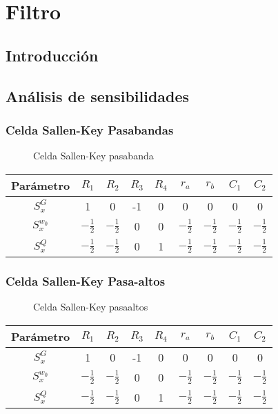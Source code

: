 \documentclass[../tc_tpfinal_main.tex]{subfiles}
\begin{document}
\chapter{Filtro}

\section{Introducción} 

\section{Análisis de sensibilidades}
\subsection{Celda Sallen-Key Pasabandas}

\begin{figure}[H]
	\centering
	
	\caption{Celda Sallen-Key pasabanda}
	\label{fig:sk_lp_schem}
\end{figure}

\begin{table}[H] 
	\centering
 				\begin{tabular}{||c c c c c c c c c||} 
 					\hline
	  Parámetro& $R_1$ & $R_2$ & $R_3$ & $R_4$ & $r_a$ & $r_b$&$C_1$&$C_2$\\ [0.5ex] 
 					\hline\hline
		 $S^G_x$& 1 & 0& -1& 0&0&0&0&0\\
		 $S^{w_0}_x$& $- \frac{1}{2}$ &$- \frac{1}{2}$& 0& 0&$- \frac{1}{2}$&$- \frac{1}{2}$&$- \frac{1}{2}$&$- \frac{1}{2}$\\
		 $S^{Q}_x$&$- \frac{1}{2}$ &$- \frac{1}{2}$& 0& 1&$- \frac{1}{2}$&$- \frac{1}{2}$&$- \frac{1}{2}$&$- \frac{1}{2}$\\[1ex] 
		\hline
	\end{tabular}
\end{table}
\subsection{Celda Sallen-Key Pasa-altos}
\begin{figure}[H]
	\centering
	
	\caption{Celda Sallen-Key pasaaltos}
	\label{fig:sk_hp_schem}
\end{figure}



\begin{table}[H] 
	\centering
 	\begin{tabular}{||c c c c c c c c c||} 
 		\hline
	 	Parámetro& $R_1$ & $R_2$ & $R_3$ & $R_4$ & $r_a$ & $r_b$&$C_1$&$C_2$\\ [0.5ex] 
 		\hline\hline
		 $S^G_x$& 1 & 0& -1& 0&0&0&0&0\\
		 $S^{w_0}_x$& $- \frac{1}{2}$ &$- \frac{1}{2}$& 0& 0&$- \frac{1}{2}$&$- \frac{1}{2}$&$- \frac{1}{2}$&$- \frac{1}{2}$\\
		 $S^{Q}_x$&$- \frac{1}{2}$ &$- \frac{1}{2}$& 0& 1&$- \frac{1}{2}$&$- \frac{1}{2}$&$- \frac{1}{2}$&$- \frac{1}{2}$\\[1ex] 
		\hline
	\end{tabular}
\end{table}
\end{document}
